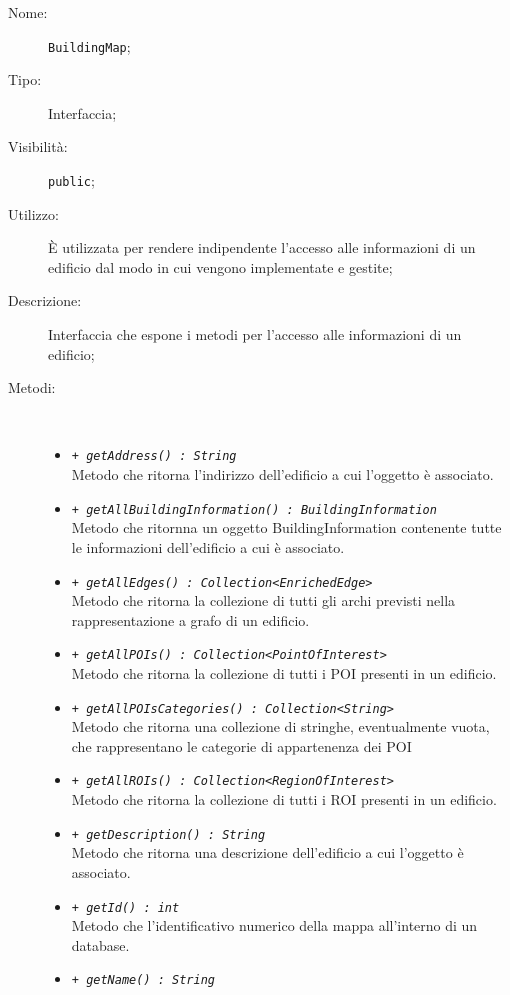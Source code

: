 \documentclass[../DefinizioneDiProdotto.tex]{subfiles}
\begin{document}
    \begin{description}
\item[Nome:] \texttt{BuildingMap};
\item[Tipo:] Interfaccia;
\item[Visibilità:] \texttt{public};
\item[Utilizzo:] È utilizzata per rendere indipendente l'accesso alle informazioni di un edificio dal modo in cui vengono implementate e gestite;
\item[Descrizione:] Interfaccia che espone i metodi per l'accesso alle informazioni di un edificio;
\item[Metodi:] \
\begin{itemize}
\item \texttt{+ \textit{getAddress() : String}}\\
Metodo che ritorna l'indirizzo dell'edificio a cui l'oggetto è associato.
 \item \texttt{+ \textit{getAllBuildingInformation() : BuildingInformation}}\\
Metodo che ritornna un oggetto BuildingInformation contenente tutte le informazioni dell'edificio a cui è associato.
 \item \texttt{+ \textit{getAllEdges() : Collection<EnrichedEdge>}}\\
Metodo che ritorna la collezione di tutti gli archi previsti nella rappresentazione a grafo di un edificio.
 \item \texttt{+ \textit{getAllPOIs() : Collection<PointOfInterest>}}\\
Metodo che ritorna la collezione di tutti i POI presenti in un edificio.
 \item \texttt{+ \textit{getAllPOIsCategories() : Collection<String>}}\\
Metodo che ritorna una collezione di stringhe, eventualmente vuota, che rappresentano le categorie di appartenenza dei POI
 \item \texttt{+ \textit{getAllROIs() : Collection<RegionOfInterest>}}\\
Metodo che ritorna la collezione di tutti i ROI presenti in un edificio.
 \item \texttt{+ \textit{getDescription() : String}}\\
Metodo che ritorna una descrizione dell'edificio a cui l'oggetto è associato.
 \item \texttt{+ \textit{getId() : int}}\\
Metodo che l'identificativo numerico della mappa all'interno di un database.
 \item \texttt{+ \textit{getName() : String}}\\

\end{itemize}
\end{description}
\end{document}
